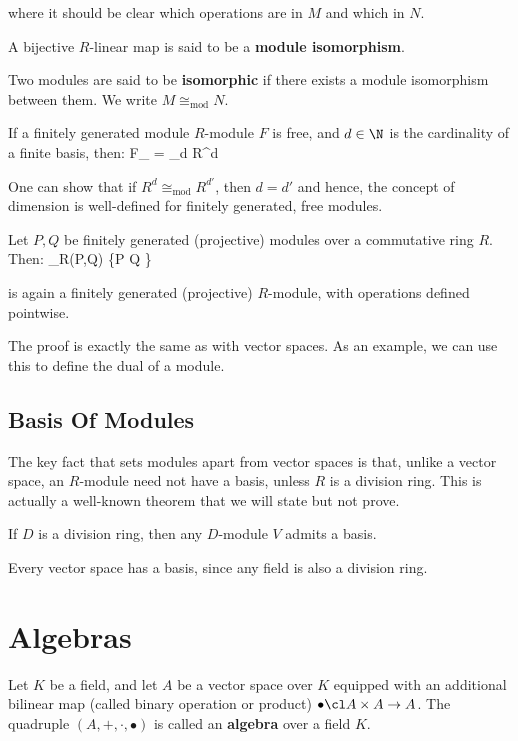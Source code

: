 where it should be clear which operations are in $M$ and which in $N$.
\ed

A bijective $R$-linear map is said to be a \textbf{module isomorphism}.
\ed

Two modules are said to be \textbf{isomorphic} if there exists a module isomorphism between them. We write
$M\cong_{\mathrm{mod}}N$.
\ed

\bt[]
If a finitely generated module $R$-module $F$ is free, and $d\in \N$ is the cardinality of a finite basis, then:
\bse
F\cong_ = _{d } \eqqcolon R^d
\ese
\et

One can show that if $R^d\cong_\mathrm{mod} R^{d'}$, then $d=d'$ and hence, the concept of dimension is well-defined
for finitely generated, free modules.

\bt[]
Let $P,Q$ be finitely generated (projective) modules over a commutative ring $R$. Then:
\bse
\Hom_R(P,Q) \coloneqq \{\phi\cl P \xrightarrow{\sim} Q \mid \phi {}\}
\ese

is again a finitely generated (projective) $R$-module, with operations defined pointwise.
\et

The proof is exactly the same as with vector spaces. As an example, we can use this to define the dual of a module.

\subsection{Basis Of Modules}

The key fact that sets modules apart from vector spaces is that, unlike a vector space, an $R$-module need not have a
basis, unless $R$ is a division ring. This is actually a well-known theorem that we will state but not prove.

\bt[]
If $D$ is a division ring, then any $D$-module $V$ admits a basis.
\et

\bt[]
Every vector space has a basis, since any field is also a division ring.
\et

\section{Algebras}

\bd[Algebra]
Let $K$ be a field, and let $A$ be a vector space over $K$ equipped with an additional bilinear map (called binary
operation or product) $\bullet \cl A\times A \to A$. The quadruple $(A,+, \cdot,\bullet)$ is called an
\textbf{algebra} over a field $K$.
\ed

